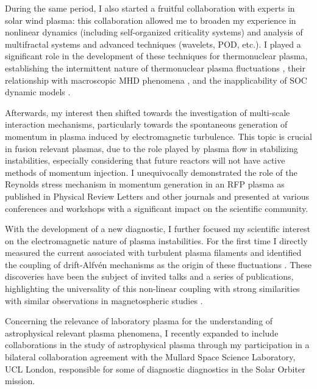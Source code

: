 During the same period, I also started a fruitful collaboration with experts in  solar wind
plasma: this collaboration allowed me to broaden my experience in nonlinear
dynamics (including self-organized criticality systems) and analysis
of multifractal systems and advanced techniques (wavelets, POD,
etc.). I played a significant role in the development of these
techniques for thermonuclear plasma, establishing the intermittent
nature of thermonuclear plasma fluctuations \cite{Vianello:2002p3579, Carbone:2002p2809, Sattin:2005p1561, Sattin:2004p1318, Spolaore:2004p245} , their relationship with macroscopic MHD phenomena \cite{Antoni:2001p662}, and the inapplicability of SOC dynamic models \cite{Antoni:2001p3221, Spada:2001p3574}.

Afterwards,  my interest then shifted towards the investigation of multi-scale interaction
mechanisms, particularly towards the spontaneous generation of momentum in
plasma induced by electromagnetic turbulence. This topic is crucial in
fusion relevant plasmas, 
due to the role played by plasma flow in stabilizing instabilities,
especially considering that future reactors will not have active
methods of momentum injection. I unequivocally demonstrated the role
of the Reynolds stress mechanism in momentum generation in an RFP
plasma as published in Physical Review Letters and other journals
\cite{Vianello:2005p1976, Vianello:2005p2671, Antoni:2005p3340} and
presented at various conferences and workshops
\cite{vianello:rfp05b, vianello:ipels05, vianello:aps04,
  vianello:ttf04, vianello:rpf04, vianello:ttf07}
with a significant impact on the scientific community.

With the development of a new diagnostic, I further focused my
scientific interest on the electromagnetic nature of plasma
instabilities. For the first time I directly measured the current
associated with turbulent plasma filaments \cite{Spolaore:2009p4115}
and identified the coupling of drift-Alfvén mechanisms as the origin
of these fluctuations \cite{Vianello:2010p4670}. These discoveries
have been the subject of invited talks and a series of publications,
highlighting the universality of this non-linear coupling with strong
similarities with similar observations in magnetospheric studies \cite{Martines:2009p4483}.

Concerning the relevance of laboratory plasma for the understanding of
astrophysical relevant plasma phenomena, I recently expanded to
include collaborations in the study of astrophysical plasma through my
participation in a bilateral collaboration agreement with the Mullard
Space Science Laboratory, UCL London, responsible for some of
diagnostic diagnostics in the Solar Orbiter mission.

